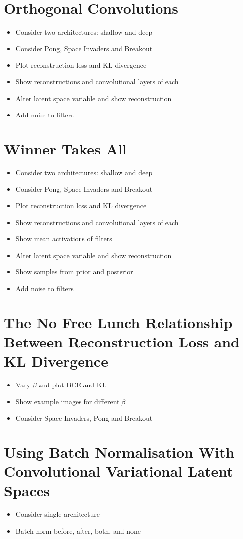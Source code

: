 %
%
%
%
%
\section{Orthogonal Convolutions}
\begin{itemize}
\item Consider two architectures: shallow and deep
\item Consider Pong, Space Invaders and Breakout
\item Plot reconstruction loss and KL divergence
\item Show reconstructions and convolutional layers of each
\item Alter latent space variable and show reconstruction
\item Add noise to filters
\end{itemize}


%
%
%
%
%
\section{Winner Takes All}
\begin{itemize}
\item Consider two architectures: shallow and deep
\item Consider Pong, Space Invaders and Breakout
\item Plot reconstruction loss and KL divergence
\item Show reconstructions and convolutional layers of each
\item Show mean activations of filters
\item Alter latent space variable and show reconstruction
\item Show samples from prior and posterior
\item Add noise to filters
\end{itemize}


%
%
%
%
%
\section{The No Free Lunch Relationship Between Reconstruction Loss and KL Divergence}

\begin{itemize}
\item Vary $\beta$ and plot BCE and KL
\item Show example images for different $\beta$
\item Consider Space Invaders, Pong and Breakout
\end{itemize}

%
%
%
%
%
\section{Using Batch Normalisation With Convolutional Variational Latent Spaces}

\begin{itemize}
\item Consider single architecture 
\item Batch norm before, after, both, and none
\end{itemize}